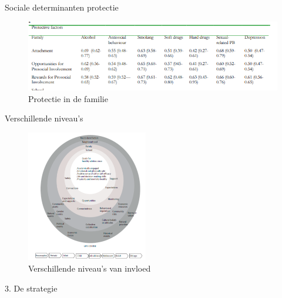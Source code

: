 \documentclass[
  ignorenonframetext,
]{beamer}
\begin{document}
\begin{frame}{Sociale determinanten protectie}
\protect\hypertarget{sociale-determinanten-protectie}{}
\begin{figure}

{\centering \includegraphics{images/PFFamilie.png}

}

\caption{Protectie in de familie}

\end{figure}
\end{frame}

\begin{frame}{Verschillende niveau's}
\protect\hypertarget{verschillende-niveaus}{}
\begin{figure}

{\centering \includegraphics[width=2.08333in,height=\textheight]{images/Niveaus.png}

}

\caption{Verschillende niveau's van invloed}

\end{figure}
\end{frame}

\begin{frame}{3. De strategie}
\protect\hypertarget{de-strategie}{}
\end{frame}
\end{document}
